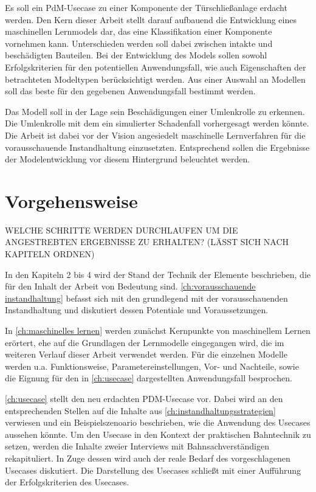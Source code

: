 Es soll ein PdM-Usecase zu einer Komponente der Türschließanlage erdacht werden. Den Kern dieser Arbeit stellt darauf aufbauend die Entwicklung eines maschinellen Lernmodels dar, das eine Klassifikation einer Komponente vornehmen kann. Unterschieden werden soll dabei zwischen intakte und beschädigten Bauteilen. Bei der Entwicklung des Models sollen sowohl Erfolgskriterien für den potentiellen Anwendungsfall, wie auch Eigenschaften der betrachteten Modeltypen berücksichtigt werden. Aus einer Auswahl an Modellen soll das beste für den gegebenen Anwendungsfall bestimmt werden.

Das Modell soll in der Lage sein Beschädigungen einer Umlenkrolle zu erkennen. Die Umlenkrolle mit dem ein simulierter Schadenfall vorhergesagt werden könnte. Die Arbeit ist dabei vor der Vision angesiedelt maschinelle Lernverfahren für die vorausschauende Instandhaltung einzusetzten. Entsprechend sollen die Ergebnisse der Modelentwicklung vor diesem Hintergrund beleuchtet werden.

\section{Vorgehensweise}
\label{sec:vorgehensweise}
WELCHE SCHRITTE WERDEN DURCHLAUFEN UM DIE ANGESTREBTEN ERGEBNISSE ZU ERHALTEN?
(LÄSST SICH NACH KAPITELN ORDNEN)

In den Kapiteln 2 bis 4 wird der Stand der Technik der Elemente beschrieben, die für den Inhalt der Arbeit von Bedeutung sind. \cref{ch:vorausschauende instandhaltung} befasst sich mit den grundlegend mit der vorausschauenden Instandhaltung und diskutiert dessen Potentiale und Voraussetzungen.

In \cref{ch:maschinelles lernen} werden zunächst Kernpunkte von maschinellem Lernen erörtert, ehe auf die Grundlagen der Lernmodelle eingegangen wird, die im weiteren Verlauf dieser Arbeit verwendet werden. Für die einzelnen Modelle werden u.a. Funktionsweise, Parametereinstellungen, Vor- und Nachteile, sowie die Eignung für den in \cref{ch:usecase} dargestellten Anwendungsfall besprochen. 

\cref{ch:usecase} stellt den neu erdachten PDM-Usecase vor. Dabei wird an den entsprechenden Stellen auf die Inhalte aus \cref{ch:instandhaltungsstrategien} verwiesen und ein Beispielszenoario beschrieben, wie die Anwendung des Usecases aussehen könnte. Um den Usecase in den Kontext der praktischen Bahntechnik zu setzen, werden die Inhalte zweier Interviews mit Bahnsachverständigen rekapituliert. In Zuge dessen wird auch der reale Bedarf des vorgeschlagenen Usecases diskutiert. Die Darstellung des Usecases schließt mit einer Aufführung der Erfolgskriterien des Usecases.

